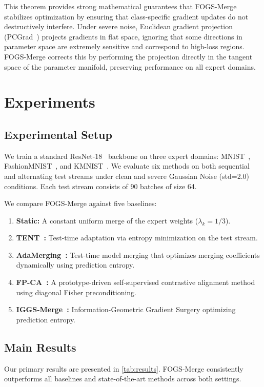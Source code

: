 \documentclass{article}
\theoremstyle{plain}
\theoremstyle{definition}
\theoremstyle{remark}
\begin{document}
This theorem provides strong mathematical guarantees that FOGS-Merge stabilizes optimization by ensuring that class-specific gradient updates do not destructively interfere. Under severe noise, Euclidean gradient projection (PCGrad~\cite{pcgrad}) projects gradients in flat space, ignoring that some directions in parameter space are extremely sensitive and correspond to high-loss regions. FOGS-Merge corrects this by performing the projection directly in the tangent space of the parameter manifold, preserving performance on all expert domains.

\section{Experiments}
\label{sec:experiments}

\subsection{Experimental Setup}
We train a standard ResNet-18~\cite{resnet} backbone on three expert domains: MNIST~\cite{mnist}, FashionMNIST~\cite{fashionmnist}, and KMNIST~\cite{kmnist}. We evaluate six methods on both sequential and alternating test streams under clean and severe Gaussian Noise (std=2.0) conditions. Each test stream consists of 90 batches of size 64.

We compare FOGS-Merge against five baselines:
\begin{enumerate}
    \item \textbf{Static:} A constant uniform merge of the expert weights ($\lambda_k = 1/3$).
    \item \textbf{TENT~\cite{tent}:} Test-time adaptation via entropy minimization on the test stream.
    \item \textbf{AdaMerging~\cite{adamerging}:} Test-time model merging that optimizes merging coefficients dynamically using prediction entropy.
    \item \textbf{FP-CA~\cite{fpca}:} A prototype-driven self-supervised contrastive alignment method using diagonal Fisher preconditioning.
    \item \textbf{IGGS-Merge~\cite{iggs}:} Information-Geometric Gradient Surgery optimizing prediction entropy.
\end{enumerate}

\subsection{Main Results}
Our primary results are presented in \cref{tab:results}. FOGS-Merge consistently outperforms all baselines and state-of-the-art methods across both settings.
\end{document}
